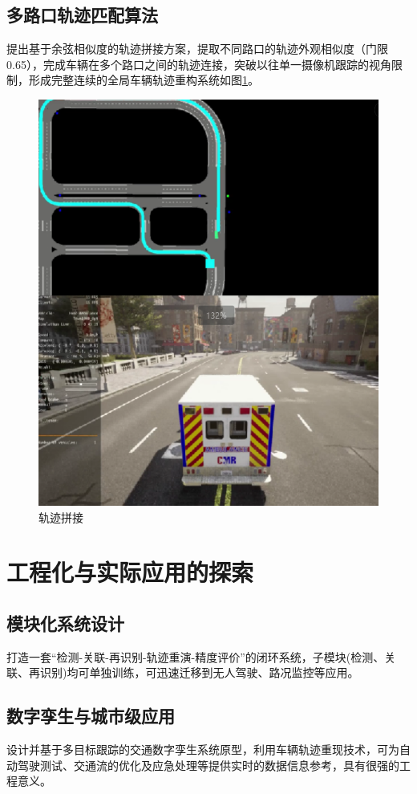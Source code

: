 \subsection{多路口轨迹匹配算法}

提出基于余弦相似度的轨迹拼接方案，提取不同路口的轨迹外观相似度（门限0.65），完成车辆在多个路口之间的轨迹连接，突破以往单一摄像机跟踪的视角限制，形成完整连续的全局车辆轨迹重构系统如图\ref{fig:p45}。


\begin{figure}[htbp] %
	\centering
	\includegraphics[width=1\textwidth]{p45} %
	\caption{轨迹拼接} %
	\label{fig:p45} %
\end{figure}




\section{工程化与实际应用的探索}

\subsection{模块化系统设计}

打造一套“检测-关联-再识别-轨迹重演-精度评价”的闭环系统，子模块(检测、关联、再识别)均可单独训练，可迅速迁移到无人驾驶、路况监控等应用。


\subsection{数字孪生与城市级应用}

设计并基于多目标跟踪的交通数字孪生系统原型，利用车辆轨迹重现技术，可为自动驾驶测试、交通流的优化及应急处理等提供实时的数据信息参考，具有很强的工程意义。


